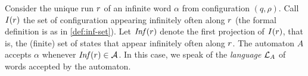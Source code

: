 \begin{definition}\label{def:acceptance-of-hdmas}
 Consider the unique run $r$ of an infinite word $\alpha$ from configuration $(q,\rho)$. Call $I(r)$ the set of configuration appearing infinitely often along $r$ (the formal definition is as in \ref{def:inf-set}). Let $\mathit{Inf}(r)$ denote the first projection of $I(r)$, that is, the (finite) set of states that appear infinitely often along $r$. The automaton $A$ accepts $\alpha$ whenever $\mathit{Inf}(r) \in \mathcal{A}$. In this case, we speak of the \emph{language} $\mathcal{L}_A$ of words accepted by the automaton.
\end{definition}
%
%	
%
%
%	
%
%
%
%
%

